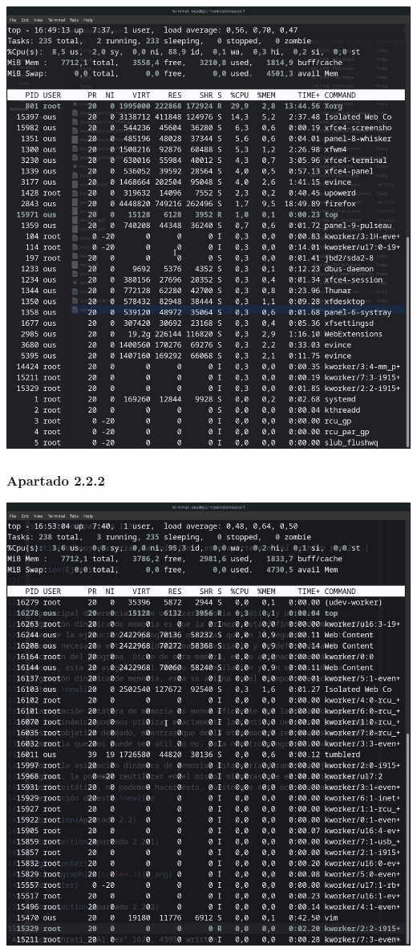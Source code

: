 \documentclass[spanish]{article}
\begin{document}
\begin{center}
\includegraphics[scale=.3]{../img/7.png}
\end{center}

\newpage

\subsubsection{Apartado 2.2.2}

\begin{center}
\includegraphics[scale=.25]{../img/8.png}
\end{center}
\end{document}
